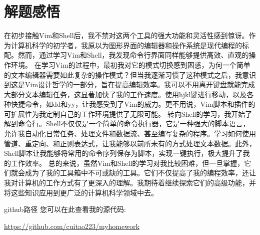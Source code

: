 \documentclass{article}
\begin{document}
\section{解题感悟}
在初步接触Vim和Shell后，我不禁对这两个工具的强大功能和灵活性感到惊讶。作为计算机科学的初学者，我原以为图形界面的编辑器和操作系统是现代编程的标配。然而，通过学习Vim和Shell，我发现命令行界面同样能够提供高效、直观的操作环境。\newline
在学习Vim的过程中，最初我对它的模式切换感到困惑，为何一个简单的文本编辑器需要如此复杂的操作模式？但当我逐渐习惯了这种模式之后，我意识到这是Vim设计哲学的一部分，旨在提高编辑效率。我可以不用离开键盘就能完成大部分文本编辑任务，这显著加快了我的工作速度。使用hjkl键进行移动，以及各种快捷命令，如dd和yy，让我感受到了Vim的威力。更不用说，Vim脚本和插件的可扩展性为我定制自己的工作环境提供了无限可能。\newline
转向Shell的学习，我开始了解到命令行。Shell不仅仅是一个简单的命令执行器，它是一种强大的脚本语言，允许我自动化日常任务、处理文件和数据流、甚至编写复杂的程序。学习如何使用管道、重定向、和正则表达式，让我能够以前所未有的方式处理文本数据。此外，Shell脚本让我能够将常用的命令序列保存为脚本，实现一键执行，极大提升了我的工作效率。
总的来说，虽然Vim和Shell的学习对我比较困难，但一旦掌握，它们就会成为了我的工具箱中不可或缺的工具。它们不仅提高了我的编程效率，还让我对计算机的工作方式有了更深入的理解。我期待着继续探索它们的高级功能，并将这些知识应用到更广泛的计算机科学领域中去。

github路径
您可以在此查看我的源代码: 

\url{https://github.com/cuitao223/myhomework}
\end{document}
